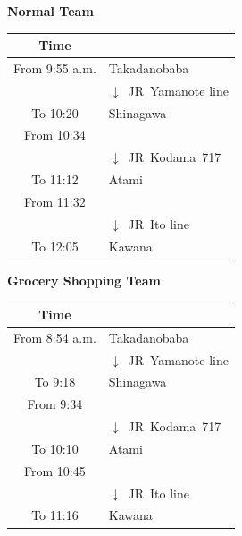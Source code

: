 \documentclass[unicode,a4paper,11pt]{ltjsarticle}
\begin{document}
\begin{center}
      \begin{minipage}[ht]{0.48\columnwidth}
            \textbf{Normal Team}

            \vspace*{5pt}

            \begin{tabular}{cl}\hline
                  Time           &                                 \\ \hline
                  From 9:55 a.m. & Takadanobaba                    \\
                                 & $\downarrow$\ JR\ Yamanote line \\
                  To 10:20       & Shinagawa                       \\
                  From 10:34     &                                 \\
                                 & $\downarrow$\ JR\ Kodama\ 717   \\
                  To 11:12       & Atami                           \\
                  From 11:32     &                                 \\
                                 & $\downarrow$\ JR\ Ito line      \\
                  To 12:05       & Kawana                          \\ \hline
            \end{tabular}
      \end{minipage}
      \begin{minipage}[ht]{0.48\columnwidth}
            \textbf{Grocery Shopping Team}

            \vspace*{5pt}

            \begin{tabular}{cl}\hline
                  Time           &                                 \\ \hline
                  From 8:54 a.m. & Takadanobaba                    \\
                                 & $\downarrow$\ JR\ Yamanote line \\
                  To 9:18        & Shinagawa                       \\
                  From 9:34      &                                 \\
                                 & $\downarrow$\ JR\ Kodama\ 717   \\
                  To 10:10       & Atami                           \\
                  From 10:45     &                                 \\
                                 & $\downarrow$\ JR\ Ito line      \\
                  To 11:16       & Kawana                          \\ \hline
            \end{tabular}
      \end{minipage}
\end{center}
\end{document}
